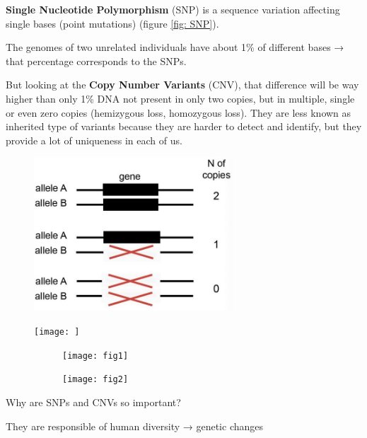 \textbf{Single Nucleotide Polymorphism} (SNP) is a sequence variation affecting
single bases (point mutations) (figure \ref{fig: SNP}).

The genomes of two unrelated individuals have about 1\% of different bases →
that percentage corresponds to the SNPs.

But looking at the \textbf{Copy Number Variants} (CNV), that difference will be
way higher than only 1\% DNA not present in only two copies, but in multiple,
single or even zero copies (hemizygous loss, homozygous loss). They are less
known as inherited type of variants because they are harder to detect and
identify, but they provide a lot of uniqueness in each of us.


\begin{figure}[H]
  \includegraphics[width=2.93475in,height=2.26167in]{image3.jpeg} 
  \centering
  \caption{}
  \label{fig: SNP2}
\end{figure}

\begin{figure}[H]
  \caption{}
  \centering
  \texttt{[image: ]}
  \label{fig: }
\end{figure}

\begin{figure}[h]
    \centering
    \begin{subfigure}[t]{0.49\textwidth}
        \centering
        \texttt{[image: fig1]}
        \caption{}
        \label{subfig: }
    \end{subfigure}
    \hfill
    \begin{subfigure}[t]{0.49\textwidth}
        \centering
        \texttt{[image: fig2]}
        \caption{}
        \label{subfig: }
    \end{subfigure}
    \caption{}
    \label{fig: }
\end{figure}

Why are SNPs and CNVs so important?

They are responsible of human diversity → genetic changes

